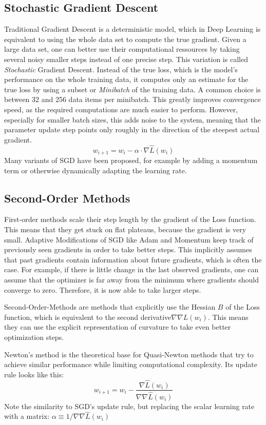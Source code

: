 \documentclass[twoside,12pt,a4paper]{report}
\begin{document}
\subsection{Stochastic Gradient Descent}
Traditional Gradient Descent is a deterministic model, which in Deep Learning is equivalent to using the whole data set to compute the true gradient. Given a large data set, one can better use their computational ressources by taking several noisy smaller steps instead of one precise step.
This variation is called \textit{Stochastic} Gradient Descent. Instead of the true loss, which is the model's performance on the whole training data, it computes only an estimate for the true loss by using a subset or \textit{Minibatch} of the training data. A common choice is between 32 and 256 data items per minibatch.
This greatly improves convergence speed, as the required computations are much easier to perform. However, especially for smaller batch sizes, this adds noise to the system, meaning that the parameter update step points only roughly in the direction of the steepest actual gradient.
$$w_{i+1} = w_i - \alpha \cdot \nabla \hat{L}(w_i) $$
Many variants of SGD have been proposed, for example by adding a momentum term or otherwise dynamically adapting the learning rate.

\subsection{Second-Order Methods}
First-order methods scale their step length by the gradient of the Loss function. This means that they get stuck on flat plateaus, because the gradient is very small.
Adaptive Modifications of SGD like Adam and Momentum keep track of previously seen gradients in order to take better steps. This implicitly assumes that past gradients contain information about future gradients, which is often the case.
For example, if there is little change in the last observed gradients, one can assume that the optimizer is far away from the minimum where gradients should converge to zero. Therefore, it is now able to take larger steps.

Second-Order-Methods are methods that explicitly use the Hessian $B$ of the Loss function, which is equivalent to the second derivative$\nabla\nabla{L}(w_i)$. This means they can use the explicit representation of curvature to take even better optimization steps.

Newton's method is the theoretical base for Quasi-Newton methods that try to achieve similar performance while limiting computational complexity. Its update rule looks like this:
$$w_{i+1} = w_i - \frac{\nabla \hat{L}(w_i)}{\nabla\nabla\hat{L}(w_i)}$$
Note the similarity to SGD's update rule, but replacing the scalar learning rate with a matrix: $\alpha \equiv 1 / \nabla\nabla\hat{L}(w_i)$
\end{document}

